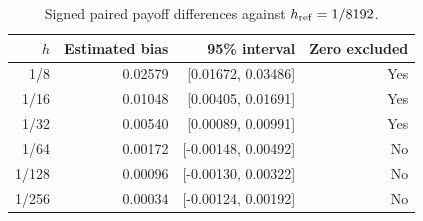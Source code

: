 \begin{table}[H]\centering\small
\caption{Signed paired payoff differences against $h_{\rm ref}=1/8192$.}
\label{tab:nonaffine-weak}
\begin{tabular}{rrrr}\toprule
$h$ & Estimated bias & 95\% interval & Zero excluded\\\midrule
1/8 & 0.02579 & [0.01672, 0.03486] & Yes\\
1/16 & 0.01048 & [0.00405, 0.01691] & Yes\\
1/32 & 0.00540 & [0.00089, 0.00991] & Yes\\
1/64 & 0.00172 & [-0.00148, 0.00492] & No\\
1/128 & 0.00096 & [-0.00130, 0.00322] & No\\
1/256 & 0.00034 & [-0.00124, 0.00192] & No\\
\bottomrule\end{tabular}
\end{table}
